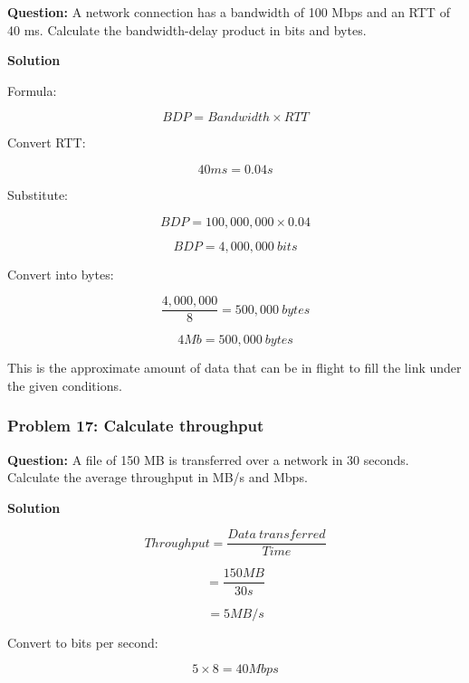 \textbf{Question:} A network connection has a bandwidth of 100 Mbps and an RTT of 40 ms. Calculate the bandwidth-delay product in bits and bytes.

\textbf{Solution}

Formula:



\[
BDP=Bandwidth\times RTT
\]



Convert RTT:



\[
40ms=0.04s
\]



Substitute:



\[
BDP=100,000,000\times0.04
\]





\[
BDP=4,000,000\ bits
\]



Convert into bytes:



\[
\frac{4,000,000}{8}=500,000\ bytes
\]





\[
\boxed{4Mb=500,000\ bytes}
\]



This is the approximate amount of data that can be in flight to fill the link under the given conditions.

\subsubsection*{Problem 17: Calculate throughput}

\textbf{Question:} A file of 150 MB is transferred over a network in 30 seconds. Calculate the average throughput in MB/s and Mbps.

\textbf{Solution}



\[
Throughput=\frac{Data\ transferred}{Time}
\]





\[
=\frac{150MB}{30s}
\]





\[
=5MB/s
\]



Convert to bits per second:



\[
5\times8=40Mbps
\]





